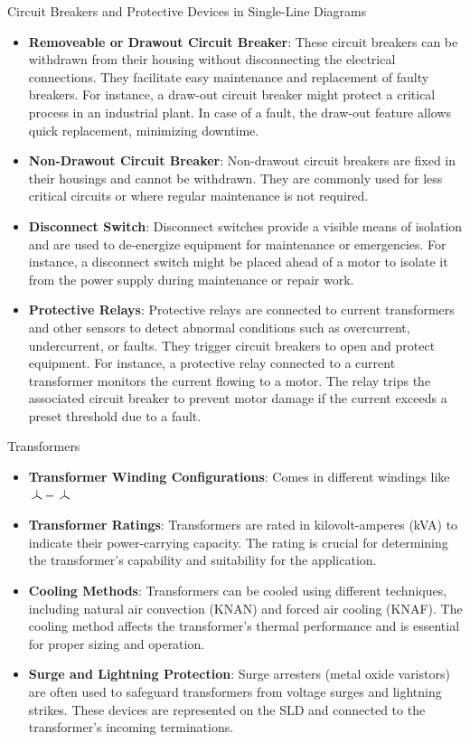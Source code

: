 Circuit Breakers and Protective Devices in Single-Line Diagrams
\begin{itemize}
    \item \textbf{Removeable or Drawout Circuit Breaker}: These circuit breakers can be withdrawn from their housing without disconnecting the electrical connections. 
    They facilitate easy maintenance and replacement of faulty breakers. 
    For instance, a draw-out circuit breaker might protect a critical process in an industrial plant. 
    In case of a fault, the draw-out feature allows quick replacement, minimizing downtime.
    \item \textbf{Non-Drawout Circuit Breaker}: Non-drawout circuit breakers are fixed in their housings and cannot be withdrawn. 
    They are commonly used for less critical circuits or where regular maintenance is not required.
    \item \textbf{Disconnect Switch}: Disconnect switches provide a visible means of isolation and are used to de-energize equipment for maintenance or emergencies. 
    For instance, a disconnect switch might be placed ahead of a motor to isolate it from the power supply during maintenance or repair work.
    \item \textbf{Protective Relays}: Protective relays are connected to current transformers and other sensors to detect abnormal conditions such as overcurrent, undercurrent, or faults. 
    They trigger circuit breakers to open and protect equipment. 
    For instance, a protective relay connected to a current transformer monitors the current flowing to a motor. 
    The relay trips the associated circuit breaker to prevent motor damage if the current exceeds a preset threshold due to a fault.
\end{itemize}

Transformers 
\begin{itemize}
    \item \textbf{Transformer Winding Configurations}: Comes in different windings like $\wye-\wye$
    \item \textbf{Transformer Ratings}: Transformers are rated in kilovolt-amperes (kVA) to indicate their power-carrying capacity. 
    The rating is crucial for determining the transformer's capability and suitability for the application.
    \item \textbf{Cooling Methods}: Transformers can be cooled using different techniques, including natural air convection (KNAN) and forced air cooling (KNAF). 
    The cooling method affects the transformer's thermal performance and is essential for proper sizing and operation.
    \item \textbf{Surge and Lightning Protection}: Surge arresters (metal oxide varistors) are often used to safeguard transformers from voltage surges and lightning strikes. 
    These devices are represented on the SLD and connected to the transformer's incoming terminations.
\end{itemize}

